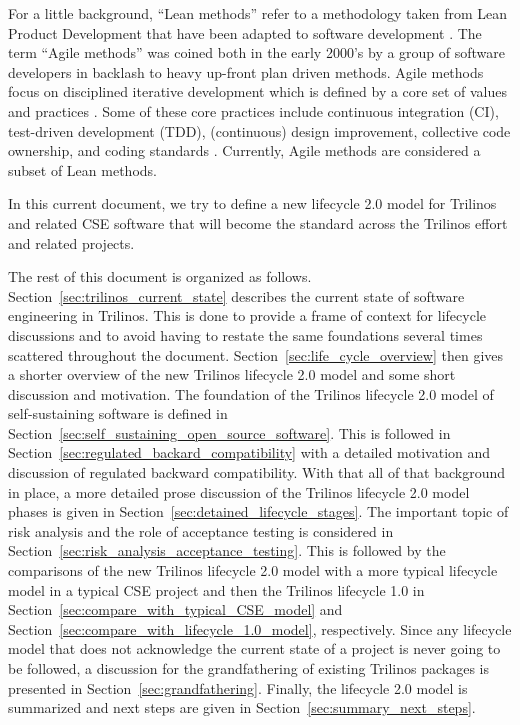 \documentclass[11pt]{SANDreport}
\begin{document}
For a little background, ``Lean methods'' refer to a methodology taken
from Lean Product Development that have been adapted to software
development {}\cite{ImplementingLeanSoftwareDevelopment}.  The term
``Agile methods'' was coined both in the early 2000's by a group of
software developers in backlash to heavy up-front plan driven methods.
Agile methods focus on disciplined iterative development which is
defined by a core set of values and practices
{}\cite{AgileSoftwareDevelopment, Scrum, XP2}.  Some of these core
practices include continuous integration (CI), test-driven
development (TDD), (continuous) design improvement, collective code
ownership, and coding standards {}\cite{AgileSoftwareDevelopment,
XP2}.  Currently, Agile methods are considered a subset of Lean
methods.

In this current document, we try to define a new lifecycle 2.0 model
for Trilinos and related CSE software that will become the standard
across the Trilinos effort and related projects.

The rest of this document is organized as follows.
Section~\ref{sec:trilinos_current_state} describes the current state
of software engineering in Trilinos.  This is done to provide a frame
of context for lifecycle discussions and to avoid having to restate
the same foundations several times scattered throughout the document.
Section~\ref{sec:life_cycle_overview} then gives a shorter overview of
the new Trilinos lifecycle 2.0 model and some short discussion and
motivation.  The foundation of the Trilinos lifecycle 2.0 model of
self-sustaining software is defined in
Section~\ref{sec:self_sustaining_open_source_software}.  This is
followed in Section~\ref{sec:regulated_backard_compatibility} with a
detailed motivation and discussion of regulated backward
compatibility.  With that all of that background in place, a more
detailed prose discussion of the Trilinos lifecycle 2.0 model phases
is given in Section~\ref{sec:detained_lifecycle_stages}.  The
important topic of risk analysis and the role of acceptance testing is
considered in Section~\ref{sec:risk_analysis_acceptance_testing}.
This is followed by the comparisons of the new Trilinos lifecycle 2.0
model with a more typical lifecycle model in a typical CSE project and
then the Trilinos lifecycle 1.0 in
Section~\ref{sec:compare_with_typical_CSE_model} and
Section~\ref{sec:compare_with_lifecycle_1.0_model}, respectively.
Since any lifecycle model that does not acknowledge the current state
of a project is never going to be followed, a discussion for the
grandfathering of existing Trilinos packages is presented in
Section~\ref{sec:grandfathering}.  Finally, the lifecycle 2.0 model is
summarized and next steps are given in
Section~\ref{sec:summary_next_steps}.
\end{document}
